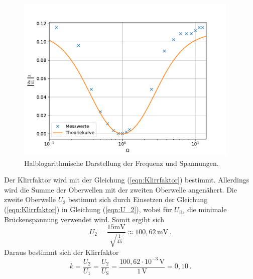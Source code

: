 \begin{figure}[H]
  \centering
  \includegraphics[width=0.95\textwidth]{plot.pdf}
  \caption{Halblogarithmische Darstellung der Frequenz und Spannungen.}
  \label{fig:WienRobinson}
\end{figure}
Der Klirrfaktor wird mit der Gleichung (\ref{eqn:Klirrfaktor}) bestimmt. Allerdings wird die Summe der Oberwellen mit der zweiten Oberwelle angenähert.
Die zweite Oberwelle $U_2$ bestimmt sich durch Einsetzen der Gleichung (\ref{eqn:Klirrfaktor}) in Gleichung (\ref{eqn:U_2}),
wobei für $U_{\text{Br}}$ die minimale Brückenspannung verwendet wird. Somit ergibt sich 
$$U_2 = \frac{15\unit{\milli\volt}}{\sqrt{\frac{1}{45}}} \approx 100,62\,\unit{\milli\volt}\,.$$
Daraus bestimmt sich der Klirrfaktor
$$k = \frac{U_2}{U_1} = \frac{U_2}{U_{\text{S}}}= \frac{100,62 \cdot 10^{-3}\,\unit{\volt}}{1\,\unit{\volt}} = 0,10\,.$$